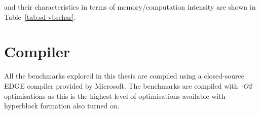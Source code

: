 and their characteristics in terms of memory/computation intensity are shown in Table~\ref{tab:sd-vbschar}.
\section{Compiler}\label{chp:setup:comp}

All the benchmarks explored in this thesis are compiled using a closed-source EDGE compiler provided by Microsoft.
The benchmarks are compiled with \textit{-O2} optimisations as this is the highest level of optimisations available with hyperblock formation also turned on.
